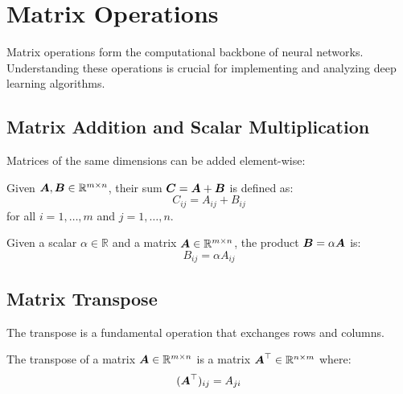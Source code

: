 
\section{Matrix Operations }
\label{sec:matrix-operations}

Matrix operations form the computational backbone of neural networks. Understanding these operations is crucial for implementing and analyzing deep learning algorithms.

\subsection{Matrix Addition and Scalar Multiplication}

Matrices of the same dimensions can be added element-wise:

\begin{definition}
Given $\boldsymbol{A}, \boldsymbol{B} \in \mathbb{R}^{m \times n}$, their sum $\boldsymbol{C} = \boldsymbol{A} + \boldsymbol{B}$ is defined as:
\begin{equation}
    C_{ij} = A_{ij} + B_{ij}
\end{equation}
for all $i = 1, \ldots, m$ and $j = 1, \ldots, n$.
\end{definition}

\begin{definition}
Given a scalar $\alpha \in \mathbb{R}$ and a matrix $\boldsymbol{A} \in \mathbb{R}^{m \times n}$, the product $\boldsymbol{B} = \alpha\boldsymbol{A}$ is:
\begin{equation}
    B_{ij} = \alpha A_{ij}
\end{equation}
\end{definition}

\subsection{Matrix Transpose}

The transpose is a fundamental operation that exchanges rows and columns.

\begin{definition}[Transpose]
The transpose of a matrix $\boldsymbol{A} \in \mathbb{R}^{m \times n}$ is a matrix $\boldsymbol{A}^\top \in \mathbb{R}^{n \times m}$ where:
\begin{equation}
    (\boldsymbol{A}^\top)_{ij} = A_{ji}
\end{equation}
\end{definition}

